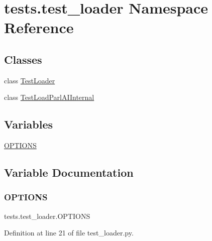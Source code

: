 \hypertarget{namespacetests_1_1test__loader}{}\section{tests.\+test\+\_\+loader Namespace Reference}
\label{namespacetests_1_1test__loader}
\subsection*{Classes}
\begin{DoxyCompactItemize}
\item 
class \hyperlink{classtests_1_1test__loader_1_1TestLoader}{Test\+Loader}
\item 
class \hyperlink{classtests_1_1test__loader_1_1TestLoadParlAIInternal}{Test\+Load\+Parl\+A\+I\+Internal}
\end{DoxyCompactItemize}
\subsection*{Variables}
\begin{DoxyCompactItemize}
\item 
\hyperlink{namespacetests_1_1test__loader_a4065f0b1c352eeba4705dd89b9f378a1}{O\+P\+T\+I\+O\+NS}
\end{DoxyCompactItemize}


\subsection{Variable Documentation}
\mbox{\label{namespacetests_1_1test__loader_a4065f0b1c352eeba4705dd89b9f378a1}} 
\subsubsection{\texorpdfstring{O\+P\+T\+I\+O\+NS}{OPTIONS}}
{\footnotesize\ttfamily tests.\+test\+\_\+loader.\+O\+P\+T\+I\+O\+NS}



Definition at line 21 of file test\+\_\+loader.\+py.

